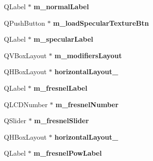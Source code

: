 \begin{DoxyCompactItemize}
\item 
\hypertarget{classUi__MainWindow_a5c7390575853badb8c830d25e914e546}{Q\-Label $\ast$ {\bfseries m\-\_\-normal\-Label}}\label{classUi__MainWindow_a5c7390575853badb8c830d25e914e546}

\item 
\hypertarget{classUi__MainWindow_a8be13798a456f5a322561e2280f45923}{Q\-Push\-Button $\ast$ {\bfseries m\-\_\-load\-Specular\-Texture\-Btn}}\label{classUi__MainWindow_a8be13798a456f5a322561e2280f45923}

\item 
\hypertarget{classUi__MainWindow_a2b7bba61145653a7d63e88831562bf1a}{Q\-Label $\ast$ {\bfseries m\-\_\-specular\-Label}}\label{classUi__MainWindow_a2b7bba61145653a7d63e88831562bf1a}

\item 
\hypertarget{classUi__MainWindow_ad34089ea5673db262ecdbf011a2f04fe}{Q\-V\-Box\-Layout $\ast$ {\bfseries m\-\_\-modifiers\-Layout}}\label{classUi__MainWindow_ad34089ea5673db262ecdbf011a2f04fe}

\item 
\hypertarget{classUi__MainWindow_a80867018070156432923d0266cc9fe25}{Q\-H\-Box\-Layout $\ast$ {\bfseries horizontal\-Layout\-\_}}\label{classUi__MainWindow_a80867018070156432923d0266cc9fe25}

\item 
\hypertarget{classUi__MainWindow_afbe9f6572d4cecc14b20673bda67fd30}{Q\-Label $\ast$ {\bfseries m\-\_\-fresnel\-Label}}\label{classUi__MainWindow_afbe9f6572d4cecc14b20673bda67fd30}

\item 
\hypertarget{classUi__MainWindow_a1ab153c8c106897d0472ab898d48aa06}{Q\-L\-C\-D\-Number $\ast$ {\bfseries m\-\_\-fresnel\-Number}}\label{classUi__MainWindow_a1ab153c8c106897d0472ab898d48aa06}

\item 
\hypertarget{classUi__MainWindow_a181ed4ebd7b1223be18c6fc8eecfd57d}{Q\-Slider $\ast$ {\bfseries m\-\_\-fresnel\-Slider}}\label{classUi__MainWindow_a181ed4ebd7b1223be18c6fc8eecfd57d}

\item 
\hypertarget{classUi__MainWindow_a03ce63974cc69b067c91bbf285cceca8}{Q\-H\-Box\-Layout $\ast$ {\bfseries horizontal\-Layout\-\_}}\label{classUi__MainWindow_a03ce63974cc69b067c91bbf285cceca8}

\item 
\hypertarget{classUi__MainWindow_aaba8c6a0afdb5ef7f9da1be6f16ce378}{Q\-Label $\ast$ {\bfseries m\-\_\-fresnel\-Pow\-Label}}\label{classUi__MainWindow_aaba8c6a0afdb5ef7f9da1be6f16ce378}


\end{DoxyCompactItemize}
